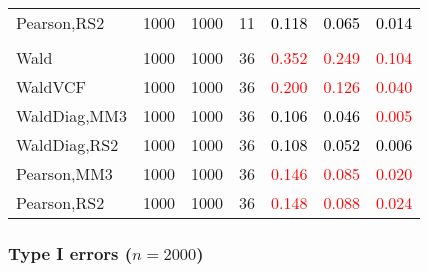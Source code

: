 \documentclass[
]{article}
\begin{document}
\begin{table}[H]
{\begin{tabular}[t]{lrrrrrr}
\hspace{1em}Pearson,RS2 & 1000 & 1000 & 11 & \textcolor{black}{0.118} & \textcolor{black}{0.065} & \textcolor{black}{0.014}\\
\addlinespace[0.3em]
\multicolumn{7}{l}{\textbf{3F 15V}}\\
\hspace{1em}Wald & 1000 & 1000 & 36 & \textcolor{red}{0.352} & \textcolor{red}{0.249} & \textcolor{red}{0.104}\\
\hspace{1em}WaldVCF & 1000 & 1000 & 36 & \textcolor{red}{0.200} & \textcolor{red}{0.126} & \textcolor{red}{0.040}\\
\hspace{1em}WaldDiag,MM3 & 1000 & 1000 & 36 & \textcolor{black}{0.106} & \textcolor{black}{0.046} & \textcolor{red}{0.005}\\
\hspace{1em}WaldDiag,RS2 & 1000 & 1000 & 36 & \textcolor{black}{0.108} & \textcolor{black}{0.052} & \textcolor{black}{0.006}\\
\hspace{1em}Pearson,MM3 & 1000 & 1000 & 36 & \textcolor{red}{0.146} & \textcolor{red}{0.085} & \textcolor{red}{0.020}\\
\hspace{1em}Pearson,RS2 & 1000 & 1000 & 36 & \textcolor{red}{0.148} & \textcolor{red}{0.088} & \textcolor{red}{0.024}\\
\bottomrule
\end{tabular}}
\endgroup{}
\end{table}

\hypertarget{type-i-errors-n2000-3}{%
\subsubsection{\texorpdfstring{Type I errors
(\(n=2000\))}{Type I errors (n=2000)}}\label{type-i-errors-n2000-3}}
\end{document}
